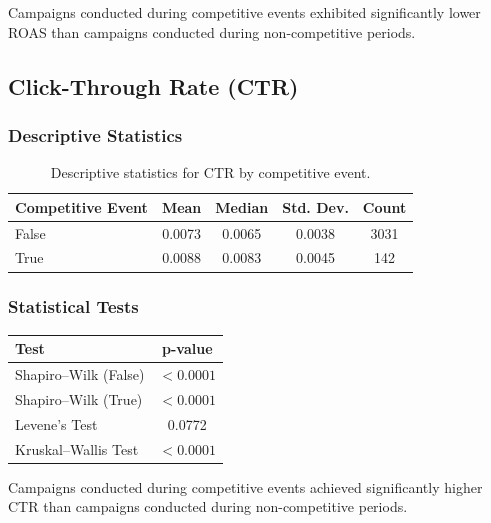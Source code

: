 Campaigns conducted during competitive events exhibited significantly lower ROAS than campaigns conducted during non-competitive periods.

\vspace{0.3cm}

\subsection{Click-Through Rate (CTR)} \label{appendix:competitive_event_performance_analysis_CTR}

\subsubsection{Descriptive Statistics}

\begin{table}[H]
	\centering
	\caption{Descriptive statistics for CTR by competitive event.}
	\begin{tabular}{lcccc}
		\toprule
		Competitive Event & Mean & Median & Std. Dev. & Count\\
		\midrule
		False & 0.0073 & 0.0065 & 0.0038 & 3031\\
		True  & 0.0088 & 0.0083 & 0.0045 & 142\\
		\bottomrule
	\end{tabular}
\end{table}

\subsubsection{Statistical Tests}

\begin{table}[H]
	\centering
	\begin{tabular}{lc}
		\toprule
		Test & p-value\\
		\midrule
		Shapiro--Wilk (False) & $<0.0001$\\
		Shapiro--Wilk (True) & $<0.0001$\\
		Levene's Test & 0.0772\\
		Kruskal--Wallis Test & $<0.0001$\\
		\bottomrule
	\end{tabular}
\end{table}

Campaigns conducted during competitive events achieved significantly higher CTR than campaigns conducted during non-competitive periods.

\vspace{0.3cm}


